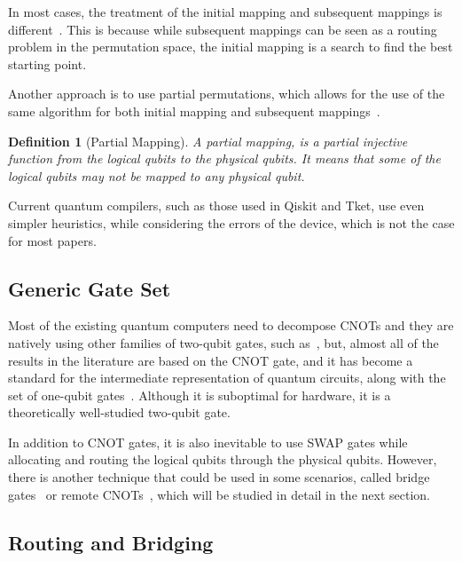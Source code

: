 \documentclass{report}
\newtheorem{definition}{Definition}
\begin{document}
In most cases, the treatment of the initial mapping and subsequent mappings is different~\cite{zhou2020, li2019}. This is because while subsequent mappings can be seen as a routing problem in the permutation space, the initial mapping is a search to find the best starting point.

Another approach is to use partial permutations, which allows for the use of the same algorithm for both initial mapping and subsequent mappings~\cite{childs, zulehner2018}.

\begin{definition}[Partial Mapping]
  A partial mapping, is a partial injective function from the logical qubits to the physical qubits.
  It means that some of the logical qubits may not be mapped to any physical qubit.
\end{definition}

Current quantum compilers, such as those used in Qiskit\cite{qiskit2023, cross2022, murali2019} and Tket\cite{sivarajah2021}, use even simpler heuristics, while considering the errors of the device, which is not the case for most papers.

\subsection{Generic Gate Set}

Most of the existing quantum computers need to decompose CNOTs and they are natively using other families of two-qubit gates, such as~\cite{foxen2020}, but, almost all of the results in the literature are based on the CNOT gate, and it has become a standard for the intermediate representation of quantum circuits, along with the set of one-qubit gates~\cite{zulehner2018,siraichi2018,li2019,zhang2021,zhou2020,itoko2019,murali2019,sivarajah2021}. Although it is suboptimal for hardware, it is a theoretically well-studied two-qubit gate.

In addition to CNOT gates, it is also inevitable to use SWAP gates while allocating and routing the logical qubits through the physical qubits. However, there is another technique that could be used in some scenarios, called bridge gates~\cite{sivarajah2021,itoko2019,shende2006,siraichi2018} or remote CNOTs~\cite{zhou2020, nash2020}, which will be studied in detail in the next section.

\subsection{Routing and Bridging}
\end{document}
